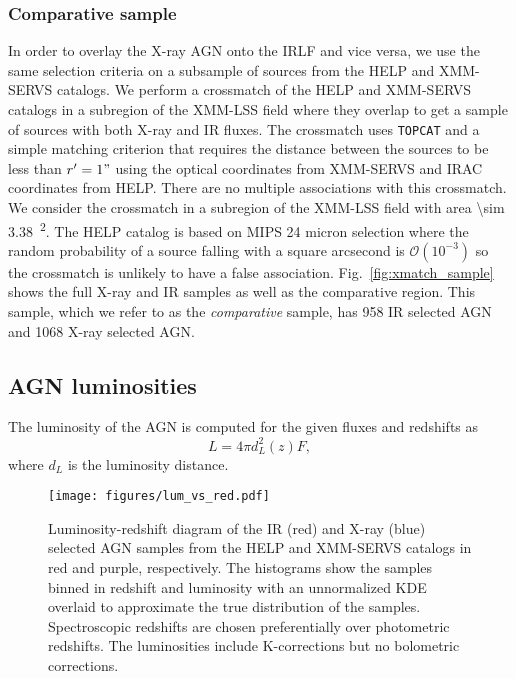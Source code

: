 \documentclass[twocolumn, trackchanges]{aastex63}
\begin{document}
\subsubsection{Comparative sample}
\label{sec:crossmatch}
In order to overlay the X-ray AGN onto the IRLF and vice versa, we use the same selection criteria on a subsample of sources from the HELP and XMM-SERVS catalogs.
We perform a crossmatch of the HELP and XMM-SERVS catalogs in a subregion of the XMM-LSS field where they overlap to get a sample of sources with both X-ray and IR fluxes.
The crossmatch uses \texttt{TOPCAT} \citep{taylor_topcat_2005} and a simple matching criterion that requires the distance between the sources to be less than $r' = 1"$ using the optical coordinates from XMM-SERVS and IRAC coordinates from HELP.
There are no multiple associations with this crossmatch.
We consider the crossmatch in a subregion of the XMM-LSS field with area \SI{\sim 3.38}{\deg^2}.
The HELP catalog is based on MIPS 24 micron selection where the random probability of a source falling with a square arcsecond is $\mathcal{O}(10^{-3})$ so the crossmatch is unlikely to have a false association.
Fig.~\ref{fig:xmatch_sample} shows the full X-ray and IR samples as well as the comparative region.
This sample, which we refer to as the \textit{comparative} sample, has 958 IR selected AGN and 1068 X-ray selected AGN.

\subsection{AGN luminosities}
\label{sec:lum}
The luminosity of the AGN is computed for the given fluxes and redshifts as
\begin{equation}
L = 4\pi d^2_L(z)F,
\end{equation}
where $d_L$ is the luminosity distance.

\begin{figure}[hptb]
\centering
\texttt{[image: figures/lum\_vs\_red.pdf]}
\caption{Luminosity-redshift diagram of the IR (red) and X-ray (blue) selected AGN samples from the HELP and XMM-SERVS catalogs in red and purple, respectively. The histograms show the samples binned in redshift and luminosity with an unnormalized KDE overlaid to approximate the true distribution of the samples. Spectroscopic redshifts are chosen preferentially over photometric redshifts. The luminosities include K-corrections but no bolometric corrections.}
\label{fig:lum_vs_red}
\end{figure}
\end{document}

